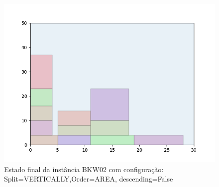\begin{figure}[H]
    \centering
    \caption[]{Estado final da instância BKW02 com configuração: Split=VERTICALLY,Order=AREA, descending=False}
    \label{fig:bkw02-vertically-area-false}
    \includegraphics[scale=0.5]{output/figures/bkw/bkw02/vertically/area/false/00}
\end{figure}